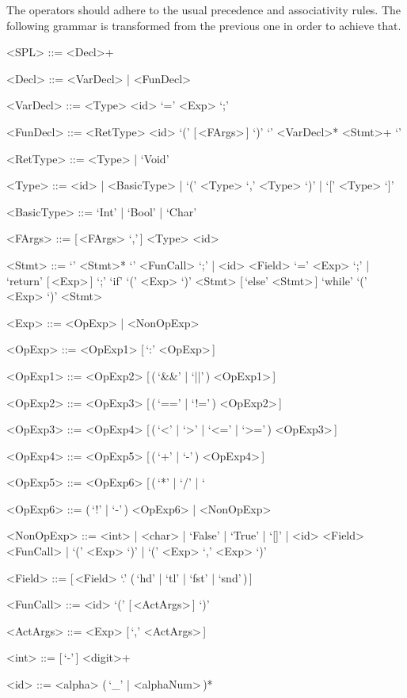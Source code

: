 \documentclass{article}
\begin{document}
The operators should adhere to the usual precedence and associativity rules.
The following grammar is transformed from the previous one in order to achieve that.
\setlength{\grammarindent}{7.1em}
\begin{grammar}
    <SPL> ::= <Decl>+

    <Decl> ::= <VarDecl> | <FunDecl>

    <VarDecl> ::= <Type> <id> `=' <Exp> `;'

    <FunDecl> ::= <RetType> <id> `(' [\,<FArgs>\,] `)' `{' <VarDecl>* <Stmt>+ `}'

    <RetType> ::= <Type> | `Void'

    <Type> ::= <id> | <BasicType> | `(' <Type> `,' <Type> `)' | `[' <Type> `]'

    <BasicType> ::= `Int' | `Bool' | `Char'

    <FArgs> ::= [\,<FArgs> `,'\,] <Type> <id>

    <Stmt> ::= `{' <Stmt>* `}'
    \alt <FunCall> `;' | <id> <Field> `=' <Exp> `;' | `return' [\,<Exp>\,] `;'
    \alt `if' `(' <Exp> `)' <Stmt> [\,`else' <Stmt>\,]
    \alt `while' `(' <Exp> `)' <Stmt>

    <Exp> ::= <OpExp> | <NonOpExp>

    <OpExp> ::= <OpExp1> [\,`:' <OpExp>\,]

    <OpExp1> ::= <OpExp2> [\,(\,`&&' | `||'\,) <OpExp1>\,]

    <OpExp2> ::= <OpExp3> [\,(\,`==' | `!='\,) <OpExp2>\,]

    <OpExp3> ::= <OpExp4> [\,(\,`<' | `>' | `<=' | `>='\,) <OpExp3>\,]

    <OpExp4> ::= <OpExp5> [\,(\,`+' | `-'\,) <OpExp4>\,]

    <OpExp5> ::= <OpExp6> [\,(\,`*' | `/' | `%

    <OpExp6> ::= (\,`!' | `-'\,) <OpExp6> | <NonOpExp>

    <NonOpExp> ::= <int> | <char> | `False' | `True' | `[]' | <id> <Field>
    \alt <FunCall> | `(' <Exp> `)' | `(' <Exp> `,' <Exp> `)'

    <Field> ::= [\,<Field> `.' (\,`hd' | `tl' | `fst' | `snd'\,)\,]

    <FunCall> ::= <id> `(' [\,<ActArgs>\,] `)'

    <ActArgs> ::= <Exp> [\,`,' <ActArgs>\,]

    <int> ::= [\,`-'\,] <digit>+

    <id> ::= <alpha> (\,`_' | <alphaNum>\,)*
\end{grammar}
\end{document}
